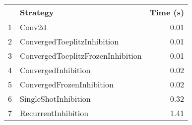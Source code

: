 \begin{tabular}{llr}
\toprule
{} &                           Strategy & Time (s) \\
\midrule
1 &                             Conv2d &     0.01 \\
2 &        ConvergedToeplitzInhibition &     0.01 \\
3 &  ConvergedToeplitzFrozenInhibition &     0.01 \\
4 &                ConvergedInhibition &     0.02 \\
5 &          ConvergedFrozenInhibition &     0.02 \\
6 &               SingleShotInhibition &     0.32 \\
7 &                RecurrentInhibition &     1.41 \\
\bottomrule
\end{tabular}
